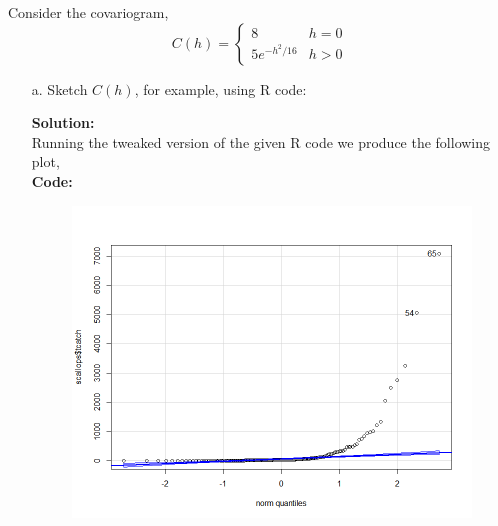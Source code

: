 \documentclass[12pt]{article}
\makeatletter
\theoremstyle{homework}
\newenvironment{exercise}[1]
{\def\@currentlabel{#1}\exercisecore}
{\endexercisecore}
\newcommand{\localhead}[1]{\par\smallskip\noindent\textbf{#1}\nobreak\\}%
\newcommand\solution{\localhead{Solution:}}
\makeatother
\begin{document}
\begin{exercise}{3} Consider the covariogram, 
  \begin{equation*}
    C(h) = 
    \begin{cases}
      8 & h = 0\\
      5e^{-h^2/16} & h > 0
    \end{cases}
  \end{equation*}
  \begin{enumerate}

    \item[a.] Sketch $C(h)$, for example, using R code:
      \begin{center}
      
      \end{center}
      \solution Running the tweaked version of the given R code we produce the following plot, \\
      \textbf{Code:}
      \begin{center}
      
      \end{center}

      \begin{figure}[H]
        \begin{center}
        \includegraphics[width = .85\textwidth]{Rplot01.png}
        \end{center}
      \end{figure}


\end{enumerate}
\end{exercise}
\end{document}
